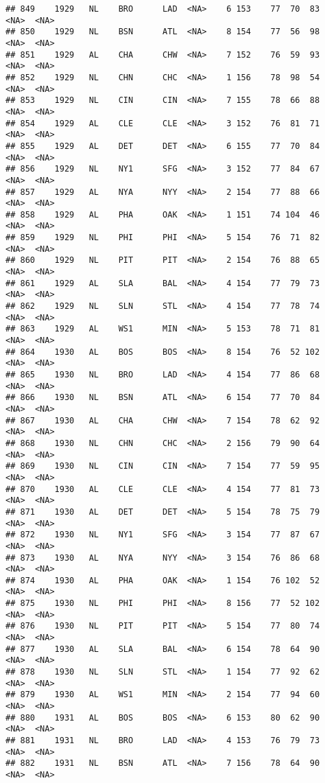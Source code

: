 \documentclass[]{article}
\begin{document}
\begin{verbatim}
## 849    1929   NL    BRO      LAD  <NA>    6 153    77  70  83   <NA>  <NA>
## 850    1929   NL    BSN      ATL  <NA>    8 154    77  56  98   <NA>  <NA>
## 851    1929   AL    CHA      CHW  <NA>    7 152    76  59  93   <NA>  <NA>
## 852    1929   NL    CHN      CHC  <NA>    1 156    78  98  54   <NA>  <NA>
## 853    1929   NL    CIN      CIN  <NA>    7 155    78  66  88   <NA>  <NA>
## 854    1929   AL    CLE      CLE  <NA>    3 152    76  81  71   <NA>  <NA>
## 855    1929   AL    DET      DET  <NA>    6 155    77  70  84   <NA>  <NA>
## 856    1929   NL    NY1      SFG  <NA>    3 152    77  84  67   <NA>  <NA>
## 857    1929   AL    NYA      NYY  <NA>    2 154    77  88  66   <NA>  <NA>
## 858    1929   AL    PHA      OAK  <NA>    1 151    74 104  46   <NA>  <NA>
## 859    1929   NL    PHI      PHI  <NA>    5 154    76  71  82   <NA>  <NA>
## 860    1929   NL    PIT      PIT  <NA>    2 154    76  88  65   <NA>  <NA>
## 861    1929   AL    SLA      BAL  <NA>    4 154    77  79  73   <NA>  <NA>
## 862    1929   NL    SLN      STL  <NA>    4 154    77  78  74   <NA>  <NA>
## 863    1929   AL    WS1      MIN  <NA>    5 153    78  71  81   <NA>  <NA>
## 864    1930   AL    BOS      BOS  <NA>    8 154    76  52 102   <NA>  <NA>
## 865    1930   NL    BRO      LAD  <NA>    4 154    77  86  68   <NA>  <NA>
## 866    1930   NL    BSN      ATL  <NA>    6 154    77  70  84   <NA>  <NA>
## 867    1930   AL    CHA      CHW  <NA>    7 154    78  62  92   <NA>  <NA>
## 868    1930   NL    CHN      CHC  <NA>    2 156    79  90  64   <NA>  <NA>
## 869    1930   NL    CIN      CIN  <NA>    7 154    77  59  95   <NA>  <NA>
## 870    1930   AL    CLE      CLE  <NA>    4 154    77  81  73   <NA>  <NA>
## 871    1930   AL    DET      DET  <NA>    5 154    78  75  79   <NA>  <NA>
## 872    1930   NL    NY1      SFG  <NA>    3 154    77  87  67   <NA>  <NA>
## 873    1930   AL    NYA      NYY  <NA>    3 154    76  86  68   <NA>  <NA>
## 874    1930   AL    PHA      OAK  <NA>    1 154    76 102  52   <NA>  <NA>
## 875    1930   NL    PHI      PHI  <NA>    8 156    77  52 102   <NA>  <NA>
## 876    1930   NL    PIT      PIT  <NA>    5 154    77  80  74   <NA>  <NA>
## 877    1930   AL    SLA      BAL  <NA>    6 154    78  64  90   <NA>  <NA>
## 878    1930   NL    SLN      STL  <NA>    1 154    77  92  62   <NA>  <NA>
## 879    1930   AL    WS1      MIN  <NA>    2 154    77  94  60   <NA>  <NA>
## 880    1931   AL    BOS      BOS  <NA>    6 153    80  62  90   <NA>  <NA>
## 881    1931   NL    BRO      LAD  <NA>    4 153    76  79  73   <NA>  <NA>
## 882    1931   NL    BSN      ATL  <NA>    7 156    78  64  90   <NA>  <NA>

\end{verbatim}
\end{document}
